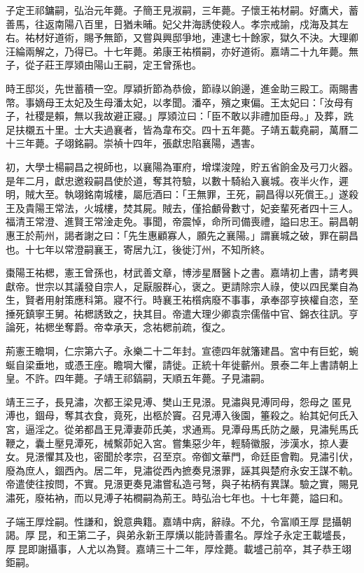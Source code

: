 子定王祁鏞嗣，弘治元年薨。子簡王見淑嗣，三年薨。子懷王祐材嗣。好鷹犬，蓄善馬，往返南陽八百里，日猶未晡。妃父井海誘使殺人。孝宗戒諭，戍海及其左右。祐材好道術，賜予無節，又嘗與興邸爭地，連逮七十餘家，獄久不決。大理卿汪綸兩解之，乃得已。十七年薨。弟康王祐櫍嗣，亦好道術。嘉靖二十九年薨。無子，從子莊王厚熲由陽山王嗣，定王曾孫也。

時王邸災，先世蓄積一空。厚潁折節為恭儉，節祿以餉邊，進金助三殿工。兩賜書幣。事嫡母王太妃及生母潘太妃，以孝聞。潘卒，殯之東偏。王太妃曰：「汝母有子，社稷是賴，無以我故避正寢。」厚熲泣曰：「臣不敢以非禮加臣母。」及葬，跣足扶櫬五十里。士大夫過襄者，皆為韋布交。四十五年薨。子靖五載堯嗣，萬曆二十三年薨。子翊銘嗣。崇禎十四年，張獻忠陷襄陽，遇害。

初，大學士楊嗣昌之視師也，以襄陽為軍府，增堞浚隍，貯五省餉金及弓刀火器。是年二月，獻忠邀殺嗣昌使於道，奪其符驗，以數十騎紿入襄城。夜半火作，遲明，賊大至。執翊銘南城樓，屬卮酒曰：「王無罪，王死，嗣昌得以死償王。」遂殺王及貴陽王常法，火城樓，焚其屍。賊去，僅拾顱骨數寸，妃妾輩死者四十三人。福清王常澄、進賢王常淦走免。事聞，帝震悼，命所司備喪禮，謚曰忠王。嗣昌朝惠王於荊州，謁者謝之曰：「先生惠顧寡人，願先之襄陽。」謂襄城之破，罪在嗣昌也。十七年以常澄嗣襄王，寄居九江，後徙汀州，不知所終。

棗陽王祐楒，憲王曾孫也，材武善文章，博涉星曆醫卜之書。嘉靖初上書，請考興獻帝。世宗以其議發自宗人，足厭服群心，褒之。更請除宗人祿，使以四民業自為生，賢者用射策應科第。寢不行。時襄王祐櫍病廢不事事，承奉邵亨挾權自恣，至捶死鎮寧王舅。祐楒誘致之，抉其目。帝遣大理少卿袁宗儒偕中官、錦衣往訊。亨論死，祐楒坐奪爵。帝幸承天，念祐楒前疏，復之。

荊憲王瞻堈，仁宗第六子。永樂二十二年封。宣德四年就籓建昌。宮中有巨蛇，蜿蜒自梁垂地，或憑王座。瞻堈大懼，請徙。正統十年徙蘄州。景泰二年上書請朝上皇。不許。四年薨。子靖王祁鎬嗣，天順五年薨。子見潚嗣。

靖王三子，長見潚，次都王梁見溥、樊山王見澋。見潚與見溥同母，怨母之匿見溥也，錮母，奪其衣食，竟死，出柩於竇。召見溥入後園，箠殺之。紿其妃何氏入宮，逼淫之。從弟都昌王見潭妻茆氏美，求通焉。見潭母馬氏防之嚴，見潚髡馬氏鞭之，囊土壓見潭死，械繫茆妃入宮。嘗集惡少年，輕騎徽服，涉漢水，掠人妻女。見澋懼其及也，密聞於孝宗，召至京。帝御文華門，命廷臣會鞫。見潚引伏，廢為庶人，錮西內。居二年，見潚從西內摭奏見澋罪，誣其與楚府永安王謀不軌。帝遣使往按問，不實。見澋更奏見潚嘗私造弓弩，與子祐柄有異謀。驗之實，賜見潚死，廢祐衲，而以見溥子祐橺嗣為荊王。時弘治七年也。十七年薨，謚曰和。

子端王厚烇嗣。性謙和，銳意典籍。嘉靖中病，辭祿。不允，令富順王厚昆攝朝謁。厚昆，和王第二子，與弟永新王厚熿以能詩善畫名。厚烇子永定王載墭長，厚昆即謝攝事，人尤以為賢。嘉靖三十二年，厚烇薨。載墭己前卒，其子恭王翊鉅嗣。


